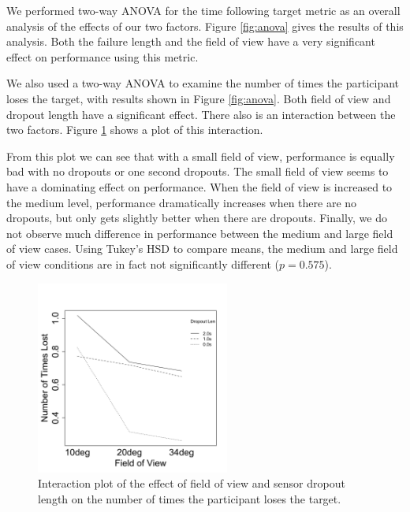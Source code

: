 \documentclass{acmsiggraph}                     %
\begin{document}


We performed two-way {ANOVA} for the time following target metric as an overall analysis of the effects of our two factors.  Figure \ref{fig:anova} gives the results of this analysis.  Both the failure length and the field of view have a very significant effect on performance using this metric.  

We also used a two-way {ANOVA} to examine the number of times the participant loses the target, with results shown in Figure \ref{fig:anova}.  Both field of view and dropout length have a significant effect.  There also is an interaction between the two factors.  Figure \ref{fig:interaction} shows a plot of this interaction.  

From this plot we can see that with a small field of view, performance is equally bad with no dropouts or one second dropouts.  The small field of view seems to have a dominating effect on performance.  When the field of view is increased to the medium level, performance dramatically increases when there are no dropouts, but only gets slightly better when there are dropouts.  Finally, we do not observe much difference in performance between the medium and large field of view cases.  Using Tukey's HSD to compare means, the medium and large field of view conditions are in fact not significantly different ($p=0.575$).

\begin{figure}[t]
	\centering
	\includegraphics[width=2.5in]{figures/numtimes_interaction.pdf}
	\caption{\label{fig:interaction}Interaction plot of the effect of field of view and sensor dropout length on the number of times the participant loses the target.}
\end{figure}
\end{document}
